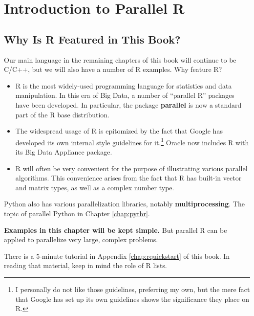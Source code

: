 \chapter{Introduction to Parallel R}
\label{chap:r} 

\section{Why Is R Featured in This Book?}

Our main language in the remaining chapters of this book will continue
to be C/C++, but we will also have a number of R examples.  Why feature R?

\begin{itemize}

\item R is the most widely-used programming language for statistics and
data manipulation.  In this era of Big Data, a number of ``parallel R''
packages have  been developed.  In particular, the package {\bf
parallel} is now a standard part of the R base distribution.

\item The widespread usage of R is epitomized by the fact that Google
has developed its own internal style guidelines for it.\footnote{I
personally do not like those guidelines, preferring my own, but the mere
fact that Google has set up its own guidelines shows the significance
they place on R.}  Oracle now includes R with its Big Data Appliance
package.

\item R will often be very convenient for the purpose of illustrating
various parallel algorithms.
This convenience arises from the fact that R has
built-in vector and matrix types, as well as a complex number type.  

\end{itemize}

Python also has various parallelization libraries, notably {\bf
multiprocessing}.  The topic of parallel Python in Chapter
\ref{chap:pythr}.

{\bf Examples in this chapter will be kept simple.}  But parallel R can
be applied to parallelize very large, complex problems.

There is a 5-minute tutorial in Appendix \ref{chap:rquickstart} of this
book.  In reading that material, keep in mind the role of R lists.

